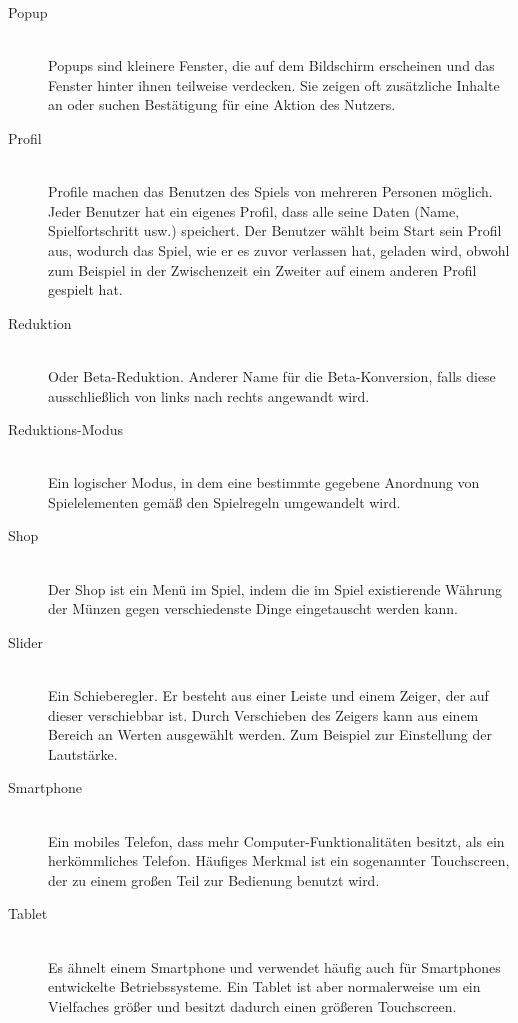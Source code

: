 \begin{description}
	\item[Popup] \hfill \\
	Popups sind kleinere Fenster, die auf dem Bildschirm erscheinen und das Fenster hinter ihnen teilweise verdecken.
	Sie zeigen oft zusätzliche Inhalte an oder suchen Bestätigung für eine Aktion des Nutzers.
	
	\item[Profil] \hfill \\
	Profile machen das Benutzen des Spiels von mehreren Personen möglich. Jeder Benutzer hat ein eigenes Profil,
	dass alle seine Daten (Name, Spielfortschritt usw.) speichert. Der Benutzer wählt beim Start sein Profil aus, wodurch das Spiel,
	wie er es zuvor verlassen hat, geladen wird, obwohl zum Beispiel in der Zwischenzeit ein Zweiter auf einem anderen Profil gespielt hat.
	
	\item[Reduktion] \hfill \\
	Oder Beta-Reduktion. Anderer Name für die Beta-Konversion, falls diese ausschließlich von links nach rechts angewandt wird.
	
	\item[Reduktions-Modus] \hfill \\
	Ein logischer Modus, in dem eine bestimmte gegebene Anordnung von Spielelementen gemäß den Spielregeln umgewandelt wird.
	
	\item[Shop] \hfill \\
	Der Shop ist ein Menü im Spiel, indem die im Spiel existierende Währung der Münzen gegen verschiedenste Dinge eingetauscht werden kann.
	
	\item[Slider] \hfill \\
	Ein Schieberegler. Er besteht aus einer Leiste und einem Zeiger, der auf dieser verschiebbar ist. Durch Verschieben des Zeigers kann aus 
	einem Bereich an Werten ausgewählt werden. Zum Beispiel zur Einstellung der Lautstärke.
	
	\item[Smartphone] \hfill \\
	Ein mobiles Telefon, dass mehr Computer-Funktionalitäten besitzt, als ein herkömmliches Telefon. Häufiges Merkmal ist ein sogenannter
	Touchscreen, der zu einem großen Teil zur Bedienung benutzt wird.
	
	\item[Tablet] \hfill \\
	Es ähnelt einem Smartphone und verwendet häufig auch für Smartphones entwickelte Betriebssysteme. 
	Ein Tablet ist aber normalerweise um ein Vielfaches größer und besitzt dadurch einen größeren Touchscreen.


\end{description}
